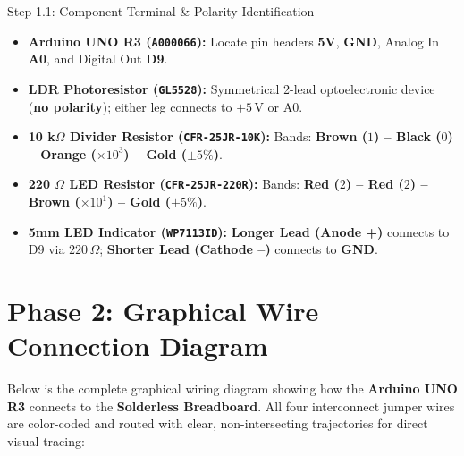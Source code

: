 \documentclass[12pt,a4paper]{article}
\begin{document}
\begin{stepbox}{Step 1.1: Component Terminal \& Polarity Identification}
\small
\begin{itemize}
    \item \textbf{Arduino UNO R3 (\texttt{A000066}):} Locate pin headers \textbf{5V}, \textbf{GND}, Analog In \textbf{A0}, and Digital Out \textbf{D9}.
    \item \textbf{LDR Photoresistor (\texttt{GL5528}):} Symmetrical 2-lead optoelectronic device (\textbf{no polarity}); either leg connects to $+5\,\text{V}$ or A0.
    \item \textbf{10 k$\Omega$ Divider Resistor (\texttt{CFR-25JR-10K}):} Bands: \textbf{Brown ($1$) -- Black ($0$) -- Orange ($\times 10^3$) -- Gold ($\pm 5\%$)}.
    \item \textbf{220 $\Omega$ LED Resistor (\texttt{CFR-25JR-220R}):} Bands: \textbf{Red ($2$) -- Red ($2$) -- Brown ($\times 10^1$) -- Gold ($\pm 5\%$)}.
    \item \textbf{5mm LED Indicator (\texttt{WP7113ID}):}
    \textbf{Longer Lead (Anode +)} connects to D9 via $220\,\Omega$; \textbf{Shorter Lead (Cathode --)} connects to \textbf{GND}.
\end{itemize}
\end{stepbox}

\newpage

\section*{Phase 2: Graphical Wire Connection Diagram}

Below is the complete graphical wiring diagram showing how the \textbf{Arduino UNO R3} connects to the \textbf{Solderless Breadboard}. All four interconnect jumper wires are color-coded and routed with clear, non-intersecting trajectories for direct visual tracing:
\end{document}
